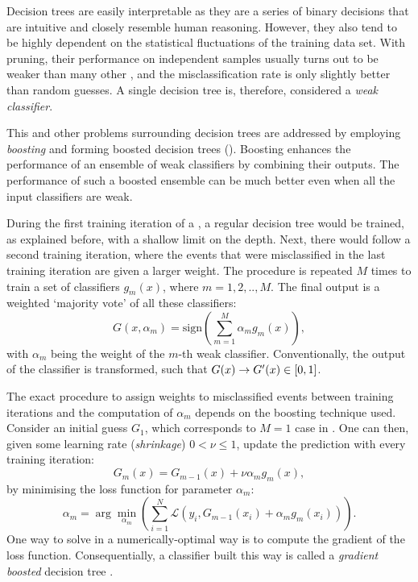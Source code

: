 Decision trees are easily interpretable as they are a series of binary decisions that are intuitive and closely resemble human reasoning.
However, they also tend to be highly dependent on the statistical fluctuations of the training data set.
With pruning, their performance on independent samples usually turns out to be weaker than many other , and the misclassification rate is only slightly better than random guesses.
A single decision tree is, therefore, considered a \textit{weak classifier}.

This and other problems surrounding decision trees are addressed by employing \textit{boosting} and forming boosted decision trees ().
Boosting enhances the performance of an ensemble of weak classifiers by combining their outputs. 
The performance of such a boosted ensemble can be much better even when all the input classifiers are weak.

During the first training iteration of a \BDT, a regular decision tree would be trained, as explained before, with a shallow limit on the depth.
Next, there would follow a second training iteration, where the events that were misclassified in the last training iteration are given a larger weight.
The procedure is repeated $M$ times to train a set of classifiers $g_{m}(x)$, where $m=1,2,..,M$.
The final output is a weighted `majority vote' of all these classifiers:
\begin{equation}\label{eq:boosted_classifier}
    G(x, \alpha_m) = \mathrm{sign}(\sum_{m=1}^M\alpha_mg_m(x)),
\end{equation}
with $\alpha_m$ being the weight of the $m$-th weak classifier.
Conventionally, the output of the classifier is transformed, such that $G(x)\rightarrow G'(x)\in[0,1]$.

The exact procedure to assign weights to misclassified events between training iterations and the computation of $\alpha_m$ depends on the boosting technique used.
Consider an initial guess $G_1$, which corresponds to $M=1$ case in .
One can then, given some learning rate (\textit{shrinkage}) $0<\nu\leq1$, update the prediction with every training iteration:
\begin{equation}
    G_m(x) = G_{m-1}(x) + \nu\alpha_mg_m(x),
\end{equation}
by minimising the loss function for parameter $\alpha_m$: 
\begin{equation}\label{eq:minimize_loss}
    \alpha_m = \arg\min_{\alpha_m}\left(\sum_{i=1}^N\mathcal{L}(y_i, G_{m-1}(x_i) + \alpha_mg_m(x_i))\right).
\end{equation}
One way to solve  in a numerically-optimal way is to compute the gradient of the loss function.
Consequentially, a classifier built this way is called a \textit{gradient boosted} decision tree \cite{FRIEDMAN1013203451}.

